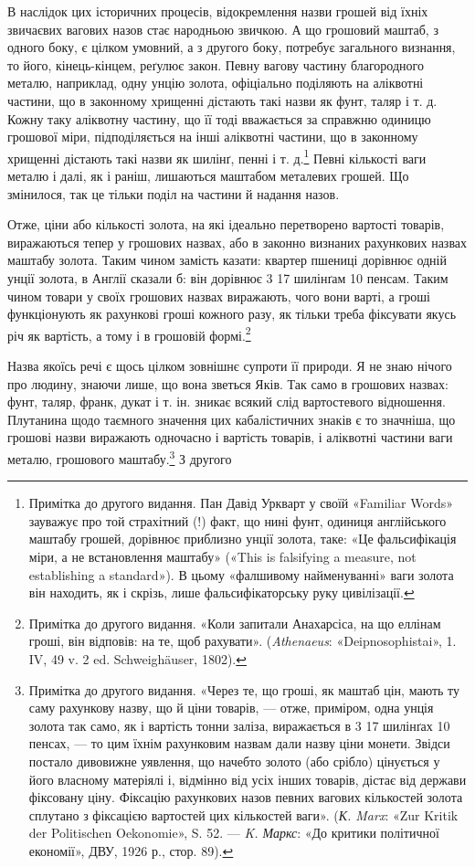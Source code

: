 В наслідок цих історичних процесів, відокремлення назви
грошей від їхніх звичаєвих вагових назов стає народньою звичкою.
А що грошовий маштаб, з одного боку, є цілком умовний,
а з другого боку, потребує загального визнання, то його, кінець-кінцем,
реґулює закон. Певну вагову частину благородного
металю, наприклад, одну унцію золота, офіціально поділяють
на аліквотні частини, що в законному хрищенні дістають
такі назви як фунт, таляр і т. д. Кожну таку аліквотну частину,
що її тоді вважається за справжню одиницю грошової міри, підподіляється
на інші аліквотні частини, що в законному хрищенні
дістають такі назви як шилінґ, пенні і т. д.\footnote{
Примітка до другого видання. Пан Давід Уркварт у своїй «Familiar
Words» зауважує про той страхітний (!) факт, що нині фунт, одиниця
англійського маштабу грошей, дорівнює приблизно  унції золота, таке:
«Це фальсифікація міри, а не встановлення маштабу» («This is falsifying
a measure, not establishing a standard»). В цьому «фалшивому
найменуванні» ваги золота він находить, як і скрізь, лише фальсифікаторську
руку цивілізації.
} Певні кількості ваги
металю і далі, як і раніш, лишаються маштабом металевих грошей.
Що змінилося, так це тільки поділ на частини й надання назов.

Отже, ціни або кількості золота, на які ідеально перетворено
вартості товарів, виражаються тепер у грошових назвах, або в
законно визнаних рахункових назвах маштабу золота. Таким
чином замість казати: квартер пшениці дорівнює одній унції
золота, в Англії сказали б: він дорівнює 3
17 шилінґам 10 пенсам. Таким чином товари у своїх грошових
назвах виражають, чого вони варті, а гроші функціонують як
рахункові гроші кожного разу, як тільки треба фіксувати якусь
річ як вартість, а тому і в грошовій формі.\footnote{
Примітка до другого видання. «Коли запитали Анахарсіса, на що
еллінам гроші, він відповів: на те, щоб рахувати». (\emph{Athenaeus}: «Deipnosophistai»,
1. IV, 49 v. 2 ed. Schweighäuser, 1802).
}

Назва якоїсь речі є щось цілком зовнішнє супроти її природи.
Я не знаю нічого про людину, знаючи лише, що вона зветься
Яків. Так само в грошових назвах: фунт, таляр, франк, дукат
і т. ін. зникає всякий слід вартостевого відношення. Плутанина
щодо таємного значення цих кабалістичних знаків є то значніша,
що грошові назви виражають одночасно і вартість товарів,
і аліквотні частини ваги металю, грошового маштабу.\footnote{
Примітка до другого видання. «Через те, що гроші, як маштаб цін,
мають ту саму рахункову назву, що й ціни товарів, — отже, приміром,
одна унція золота так само, як і вартість тонни заліза, виражається в
3 17 шилінґах 10 пенсах, — то цим їхнім рахунковим
назвам дали назву ціни монети. Звідси постало дивовижне уявлення, що
начебто золото (або срібло) цінується у його власному матеріялі і, відмінно
від усіх інших товарів, дістає від держави фіксовану ціну. Фіксацію
рахункових назов певних вагових кількостей золота сплутано з
фіксацією вартостей цих кількостей ваги». (\emph{К. Marx}: «Zur Kritik der
Politischen Oekonomie», S. 52. — \emph{K. Маркс}: «До критики політичної
економії», ДВУ, 1926 р., стор. 89).
} З другого
\parbreak{}  %
